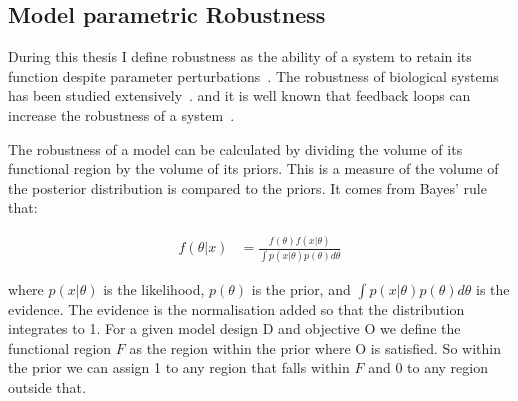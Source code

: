 \subsection{Model parametric Robustness}
\label{sec:rob_back}
During this thesis I define robustness as the ability of a system to retain its function despite parameter perturbations~\autocite{Stelling:2004wo}. The robustness of biological systems has been studied extensively~\autocite{Barkai:1997cd, Stelling:2004wo, Prill:2005fq, Kim:2006uk, Kitano:2007cp, Hafner:2009ct, Shinar:2010dd, ZamoraSillero:2011jw, Woods:2016eh}. and it is well known that feedback loops can increase the robustness of a system~\autocite{Becskei:2000ft,	 DOYLE:2005ul}.

The robustness of a model can be calculated by dividing the volume of its functional region by the volume of its priors. This is a measure of the volume of the posterior distribution is compared to the priors. It comes from Bayes' rule that:

\begin{align}
	f(\theta|x) &= \frac{f(\theta)f(x|\theta)}{\int p(x|\theta)p(\theta)d\theta}
\end{align}

\noindent where $p(x|\theta)$ is the likelihood, $p(\theta)$ is the prior, and $\displaystyle \int p(x|\theta)p(\theta)d\theta$ is the evidence. The evidence is the normalisation  added so that the distribution integrates to 1. For a given model design D and objective O we define the functional region $F$ as the region within the prior where O is satisfied. So within the prior we can assign 1 to any region that falls within $F$ and 0 to any region outside that. 

